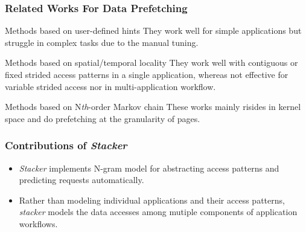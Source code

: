 \documentclass{beamer}
\begin{document}
\begin{frame}
\frametitle{Related Works For Data Prefetching}
\begin{block}{Methods based on user-defined hints}
    They work well for simple applications but struggle in complex tasks due to the manual tuning. \\
\end{block}
\begin{block}{Methods based on spatial/temporal locality} 
    They work well with contiguous or fixed strided access patterns in a single application, whereas not effective for variable strided access nor in multi-application workflow.
\end{block}
\begin{block}{Methods based on N\textit{th}-order Markov chain}
    These works mainly risides in kernel space and do prefetching at the granularity of pages.        
\end{block}
\end{frame}
\begin{frame}
\frametitle{Contributions of \textit{Stacker}}
    \begin{itemize}
        \item \textit{Stacker} implements N-gram model for abstracting access patterns and predicting requests automatically.
        \item Rather than modeling individual applications and their access patterns, \textit{stacker} models the data accesses among mutiple components of application workflows.
    \end{itemize}


\end{frame}
\end{document}
